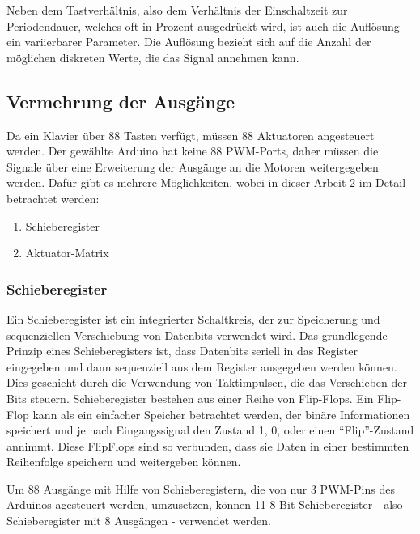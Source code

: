 Neben dem Tastverhältnis, also dem Verhältnis der Einschaltzeit zur Periodendauer, welches oft in Prozent ausgedrückt wird, ist auch die Auflösung ein variierbarer Parameter.
Die Auflösung bezieht sich auf die Anzahl der möglichen diskreten Werte, die das Signal annehmen kann.


\subsection{Vermehrung der Ausgänge}\label{output}

Da ein Klavier über 88 Tasten verfügt, müssen 88 Aktuatoren angesteuert werden. Der gewählte Arduino hat keine 88 \ac{PWM}-Ports, daher
müssen die Signale über eine Erweiterung der Ausgänge an die Motoren weitergegeben werden. Dafür gibt es mehrere Möglichkeiten,
wobei in dieser Arbeit 2 im Detail betrachtet werden:

\begin{enumerate}
	\item Schieberegister
	\item Aktuator-Matrix
\end{enumerate}


\subsubsection{Schieberegister}
Ein Schieberegister ist ein integrierter Schaltkreis, der zur Speicherung und sequenziellen Verschiebung von
Datenbits verwendet wird.\newline
Das grundlegende Prinzip eines Schieberegisters ist, dass Datenbits seriell in das Register eingegeben und dann
sequenziell aus dem Register ausgegeben werden können.
Dies geschieht durch die Verwendung von Taktimpulsen, die das Verschieben der Bits steuern.\newline
Schieberegister bestehen aus einer Reihe von Flip-Flops.
Ein Flip-Flop kann als ein einfacher Speicher betrachtet werden, der binäre Informationen speichert und je nach
Eingangssignal den Zustand 1, 0, oder einen \enquote{Flip}-Zustand annimmt.
Diese FlipFlops sind so verbunden, dass sie Daten in einer bestimmten Reihenfolge speichern und weitergeben können.

Um 88 Ausgänge mit Hilfe von Schieberegistern, die von nur 3 \ac{PWM}-Pins des Arduinos agesteuert werden, umzusetzen,
können 11 8-Bit-Schieberegister  - also Schieberegister mit 8 Ausgängen - verwendet werden.


